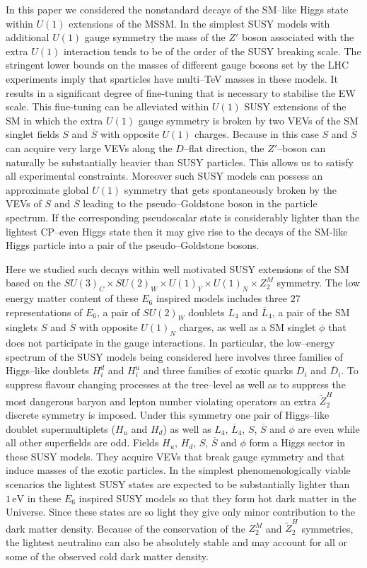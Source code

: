\documentclass[12pt,a4paper]{article}
\begin{document}
In this paper we considered the nonstandard decays of the SM--like Higgs state within $U(1)$ extensions
of the MSSM. In the simplest SUSY models with additional $U(1)$ gauge symmetry the mass of the $Z'$ boson
associated with the extra $U(1)$ interaction tends to be of the order of the SUSY breaking scale. The stringent
lower bounds on the masses of different gauge bosons set by the LHC experiments imply that sparticles
have multi--TeV masses in these models. It results in a significant degree of fine-tuning
that is necessary
to stabilise the EW scale. This fine-tuning can be alleviated within $U(1)$ SUSY extensions of the SM
in which the extra $U(1)$ gauge symmetry is broken by two VEVs of the SM singlet fields $S$ and $\overline{S}$
with opposite $U(1)$ charges. Because in this case $S$ and $\overline{S}$ can acquire very large VEVs along
the $D$--flat direction, the $Z'$--boson can naturally be substantially heavier than SUSY particles. This allows us to satisfy all experimental constraints. Moreover such SUSY models can possess an approximate
global $U(1)$ symmetry that gets spontaneously broken by the VEVs of $S$ and $\overline{S}$ leading
to the pseudo--Goldstone boson in the particle spectrum. If the corresponding pseudoscalar state is considerably
lighter than the lightest CP--even Higgs state then it may give rise to the 
decays of the SM-like Higgs particle
into a pair of the pseudo--Goldstone bosons.

Here we studied such decays within well motivated SUSY extensions of the SM based on the
$SU(3)_C\times SU(2)_W\times U(1)_Y\times U(1)_{N}\times Z_{2}^{M}$ symmetry. The low energy matter
content of these $E_6$ inspired models includes three $27$ representations of $E_6$, a pair of $SU(2)_W$ doublets
$L_4$ and $\overline{L}_4$, a pair of the SM singlets $S$ and $\overline{S}$ with opposite $U(1)_{N}$ charges,
as well as a SM singlet $\phi$ that does not participate in the gauge interactions. 
In particular, the low--energy spectrum of the
SUSY models being considered here involves three families of Higgs--like doublets $H^{d}_{i}$ and
$H^{u}_{i}$ and three families of exotic quarks $D_i$ and $\bar{D}_i$. To suppress flavour changing processes
at the tree--level as well as to suppress the most dangerous baryon and lepton 
number violating operators an extra
$\tilde{Z}^{H}_2$ discrete symmetry is imposed. Under this symmetry one pair of 
Higgs--like doublet
supermultiplets ($H_u$ and $H_d$) as well as $L_4$, $\overline{L}_4$, $S$, $\overline{S}$ and $\phi$ are even
while all other superfields are odd. Fields $H_u$, $H_d$, $S$, $\overline{S}$ and $\phi$ form a Higgs sector
in these SUSY models. They acquire VEVs that break gauge symmetry and that induce masses
 of the exotic particles.
In the simplest phenomenologically viable scenarios the lightest SUSY states are expected to be substantially lighter
than $1\,\mbox{eV}$ in these $E_6$ inspired SUSY models so that they form hot dark matter in the Universe.
Since these states are so light they give only minor contribution to the dark matter density. Because of the conservation
of the $Z^{M}_2$ and $\tilde{Z}^{H}_2$ symmetries, the lightest neutralino can also 
be absolutely stable and
may account for all or some of the observed cold dark matter density.
\end{document}
